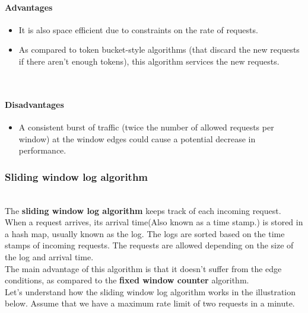 \paragraph{Advantages}\label{TXsyd0ihhX_A0vxOHdfic}

\begin{itemize}
\item
\protect{}\label{ouL1XqbccRbFGBtJeabn7}
It is also space efficient due to constraints on the rate of requests.
\item
\protect{}\label{3c8dlvQOYX9uokCBhtmjn}
As compared to token bucket-style algorithms (that discard the new requests if there aren't enough tokens), this algorithm services the new requests.
\end{itemize}
\\
\paragraph{Disadvantages}\label{fUqha70lhnGSJ2P-wwQZB}

\begin{itemize}
\item
\protect{}\label{AZjwd7D6oKKKmCphv-0Yg}
A consistent burst of traffic (twice the number of allowed requests per window) at the window edges could cause a potential decrease in performance.
\end{itemize}

\subsubsection{Sliding window log algorithm}\label{4gFY1cUHd0C6474tFaYqH}
\\
The \textbf{sliding window log algorithm} keeps track of each incoming request. When a request arrives, its arrival time(Also known as a time stamp.) is stored in a hash map, usually known as the log. The logs are sorted based on the time stamps of incoming requests. The requests are allowed depending on the size of the log and arrival time.
\\
The main advantage of this algorithm is that it doesn't suffer from the edge conditions, as compared to the \textbf{fixed window counter} algorithm.
\\
Let's understand how the sliding window log algorithm works in the illustration below. Assume that we have a maximum rate limit of two requests in a minute.

